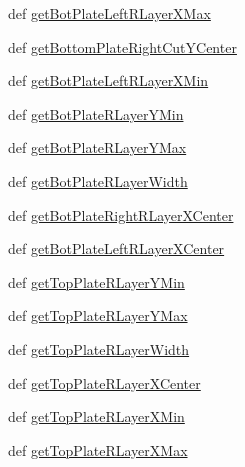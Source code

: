 \begin{DoxyCompactItemize}
\item 
def \hyperlink{classpython_1_1CapacitorUnit_1_1CapacitorUnit_ae3887820ee80da10f77b451e5f068635}{get\-Bot\-Plate\-Left\-R\-Layer\-X\-Max}
\item 
def \hyperlink{classpython_1_1CapacitorUnit_1_1CapacitorUnit_a2d9186515736c9fd74725eca251f6e2b}{get\-Bottom\-Plate\-Right\-Cut\-Y\-Center}
\item 
def \hyperlink{classpython_1_1CapacitorUnit_1_1CapacitorUnit_a52e8ea7265119216e234eab32bc542ef}{get\-Bot\-Plate\-Left\-R\-Layer\-X\-Min}
\item 
def \hyperlink{classpython_1_1CapacitorUnit_1_1CapacitorUnit_a2f87580a615f6b0450d43a032adf81d5}{get\-Bot\-Plate\-R\-Layer\-Y\-Min}
\item 
def \hyperlink{classpython_1_1CapacitorUnit_1_1CapacitorUnit_aa6cb9e5f6ba2d4e4ce5f63ca1d785e7e}{get\-Bot\-Plate\-R\-Layer\-Y\-Max}
\item 
def \hyperlink{classpython_1_1CapacitorUnit_1_1CapacitorUnit_a3463504463c87fb7aab28ca04597c169}{get\-Bot\-Plate\-R\-Layer\-Width}
\item 
def \hyperlink{classpython_1_1CapacitorUnit_1_1CapacitorUnit_aff2f6d078abdcf0d679aa9b697928f34}{get\-Bot\-Plate\-Right\-R\-Layer\-X\-Center}
\item 
def \hyperlink{classpython_1_1CapacitorUnit_1_1CapacitorUnit_a7440876afb0ff33ba0ee5cea4e9e0aed}{get\-Bot\-Plate\-Left\-R\-Layer\-X\-Center}
\item 
def \hyperlink{classpython_1_1CapacitorUnit_1_1CapacitorUnit_a836a7c11713aa3a08504a498b90fb5ee}{get\-Top\-Plate\-R\-Layer\-Y\-Min}
\item 
def \hyperlink{classpython_1_1CapacitorUnit_1_1CapacitorUnit_aea137748a99552369414fc5ffec3a41d}{get\-Top\-Plate\-R\-Layer\-Y\-Max}
\item 
def \hyperlink{classpython_1_1CapacitorUnit_1_1CapacitorUnit_a9c1452c170eeb58d060bb5fe72fae5a9}{get\-Top\-Plate\-R\-Layer\-Width}
\item 
def \hyperlink{classpython_1_1CapacitorUnit_1_1CapacitorUnit_a295a807958d27c156f87102762d353d6}{get\-Top\-Plate\-R\-Layer\-X\-Center}
\item 
def \hyperlink{classpython_1_1CapacitorUnit_1_1CapacitorUnit_a28208011c71e1712625c1148a67d943c}{get\-Top\-Plate\-R\-Layer\-X\-Min}
\item 
def \hyperlink{classpython_1_1CapacitorUnit_1_1CapacitorUnit_a9788696eb8f1cffde53de39c7f2ffcaa}{get\-Top\-Plate\-R\-Layer\-X\-Max}
\end{DoxyCompactItemize}


